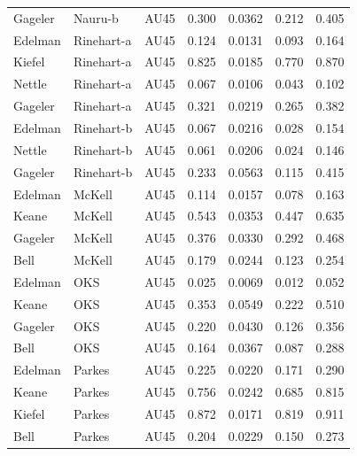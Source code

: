 \documentclass{monashthesis}
\begin{document}
\begin{center}
\begin{longtable}{lllllll}
Gageler & Nauru-b & AU45 & 0.300 & 0.0362 & 0.212 & 0.405 \\
Edelman & Rinehart-a & AU45 & 0.124 & 0.0131 & 0.093 & 0.164 \\
Kiefel & Rinehart-a & AU45 & 0.825 & 0.0185 & 0.770 & 0.870 \\
Nettle & Rinehart-a & AU45 & 0.067 & 0.0106 & 0.043 & 0.102 \\
Gageler & Rinehart-a & AU45 & 0.321 & 0.0219 & 0.265 & 0.382 \\
Edelman & Rinehart-b & AU45 & 0.067 & 0.0216 & 0.028 & 0.154 \\
Nettle & Rinehart-b & AU45 & 0.061 & 0.0206 & 0.024 & 0.146 \\
Gageler & Rinehart-b & AU45 & 0.233 & 0.0563 & 0.115 & 0.415 \\
Edelman & McKell & AU45 & 0.114 & 0.0157 & 0.078 & 0.163 \\
Keane & McKell & AU45 & 0.543 & 0.0353 & 0.447 & 0.635 \\
Gageler & McKell & AU45 & 0.376 & 0.0330 & 0.292 & 0.468 \\
Bell & McKell & AU45 & 0.179 & 0.0244 & 0.123 & 0.254 \\
Edelman & OKS & AU45 & 0.025 & 0.0069 & 0.012 & 0.052 \\
Keane & OKS & AU45 & 0.353 & 0.0549 & 0.222 & 0.510 \\
Gageler & OKS & AU45 & 0.220 & 0.0430 & 0.126 & 0.356 \\
Bell & OKS & AU45 & 0.164 & 0.0367 & 0.087 & 0.288 \\
Edelman & Parkes & AU45 & 0.225 & 0.0220 & 0.171 & 0.290 \\
Keane & Parkes & AU45 & 0.756 & 0.0242 & 0.685 & 0.815 \\
Kiefel & Parkes & AU45 & 0.872 & 0.0171 & 0.819 & 0.911 \\
Bell & Parkes & AU45 & 0.204 & 0.0229 & 0.150 & 0.273 \\
\end{longtable}
\end{center}
\end{document}
